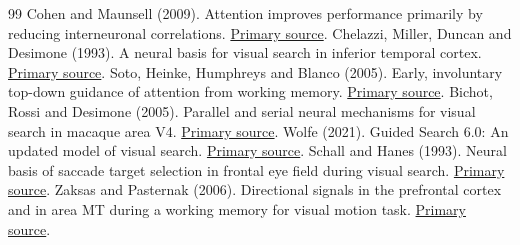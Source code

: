 \documentclass[11pt]{article}
\begin{document}
\begin{thebibliography}{99}
 Cohen and Maunsell (2009). Attention improves performance primarily by reducing interneuronal correlations. \href{https://pubmed.ncbi.nlm.nih.gov/19915566/}{Primary source}.
 Chelazzi, Miller, Duncan and Desimone (1993). A neural basis for visual search in inferior temporal cortex. \href{https://pubmed.ncbi.nlm.nih.gov/8497317/}{Primary source}.
 Soto, Heinke, Humphreys and Blanco (2005). Early, involuntary top-down guidance of attention from working memory. \href{https://www.comp-psych.bham.ac.uk/publications/soto_jep2005.pdf}{Primary source}.
 Bichot, Rossi and Desimone (2005). Parallel and serial neural mechanisms for visual search in macaque area V4. \href{https://doi.org/10.1126/science.1109676}{Primary source}.
 Wolfe (2021). Guided Search 6.0: An updated model of visual search. \href{https://doi.org/10.3758/s13423-020-01859-9}{Primary source}.
 Schall and Hanes (1993). Neural basis of saccade target selection in frontal eye field during visual search. \href{https://pubmed.ncbi.nlm.nih.gov/8247155/}{Primary source}.
 Zaksas and Pasternak (2006). Directional signals in the prefrontal cortex and in area MT during a working memory for visual motion task. \href{https://pubmed.ncbi.nlm.nih.gov/17093094/}{Primary source}.
\end{thebibliography}
\end{document}
